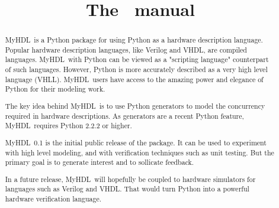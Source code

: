 \documentclass{manual}
\title{The \myhdl\ manual}
\newcommand{\myhdl}{{MyHDL}}
\begin{document}
\maketitle



\begin{abstract}

\noindent

\myhdl\ is a Python package for using Python as a hardware description
language. Popular hardware description languages, like Verilog and
VHDL, are compiled languages. \myhdl\ with Python can be viewed as a
"scripting language" counterpart of such languages. However, Python is
more accurately described as a very high level language
(VHLL). \myhdl\ users have access to the amazing power and elegance of
Python for their modeling work.

The key idea behind \myhdl\ is to use Python generators to model the
concurrency required in hardware descriptions. As generators are a
recent Python feature, \myhdl\ requires Python 2.2.2 or higher.

\myhdl\ 0.1 is the initial public release of the package. It can be
used to experiment with high level modeling, and with verification
techniques such as unit testing. But the primary goal is to generate
interest and to sollicate feedback.

In a future release, \myhdl\ will hopefully be coupled to hardware
simulators for languages such as Verilog and VHDL. That would turn
Python into a powerful hardware verification language.

\end{abstract}

\tableofcontents






\end{document}
